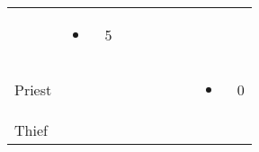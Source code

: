 \documentclass[12pt]{article}
\begin{document}
\begin{longtable}[]{@{}llllllllll@{}}
\begin{minipage}[t]{0.06\columnwidth}
\strut\end{minipage} &
\begin{minipage}[t]{0.07\columnwidth}\raggedright\strut
\begin{itemize}
\item
\end{itemize}
\strut\end{minipage} &
\begin{minipage}[t]{0.08\columnwidth}\raggedright\strut
5
\strut\end{minipage}\tabularnewline
\begin{minipage}[t]{0.13\columnwidth}\raggedright\strut
Priest
\strut\end{minipage} &
\begin{minipage}[t]{0.06\columnwidth}\raggedright\strut
\strut\end{minipage} &
\begin{minipage}[t]{0.06\columnwidth}\raggedright\strut
\strut\end{minipage} &
\begin{minipage}[t]{0.06\columnwidth}\raggedright\strut
\strut\end{minipage} &
\begin{minipage}[t]{0.06\columnwidth}\raggedright\strut
\strut\end{minipage} &
\begin{minipage}[t]{0.06\columnwidth}\raggedright\strut
\strut\end{minipage} &
\begin{minipage}[t]{0.06\columnwidth}\raggedright\strut
\strut\end{minipage} &
\begin{minipage}[t]{0.06\columnwidth}\raggedright\strut
\strut\end{minipage} &
\begin{minipage}[t]{0.07\columnwidth}\raggedright\strut
\begin{itemize}
\item
\end{itemize}
\strut\end{minipage} &
\begin{minipage}[t]{0.08\columnwidth}\raggedright\strut
0
\strut\end{minipage}\tabularnewline
\begin{minipage}[t]{0.13\columnwidth}\raggedright\strut
Thief
\strut\end{minipage} &
\begin{minipage}[t]{0.06\columnwidth}\raggedright\strut
\strut\end{minipage} &

\end{longtable}
\end{document}
